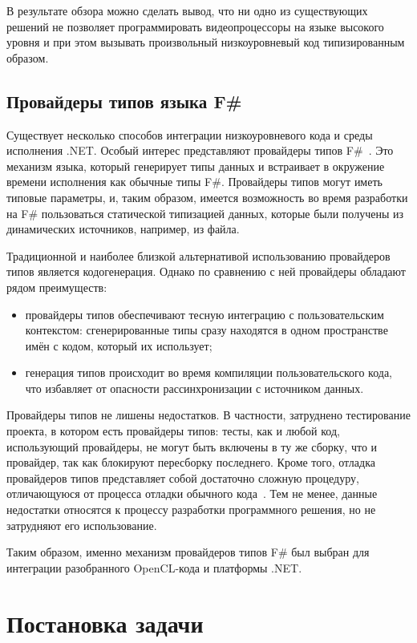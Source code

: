 \documentclass[14pt]{matmex-diploma}
\begin{document}
В результате обзора можно сделать вывод, что ни одно из существующих решений не позволяет программировать видеопроцессоры на языке высокого уровня и при этом вызывать произвольный низкоуровневый код типизированным образом.

\subsection{Провайдеры типов языка F\#}
Существует несколько способов интеграции низкоуровневого кода и среды исполнения .NET. Особый интерес представляют провайдеры типов F\#~\cite{TypeProviders}. Это механизм языка, который генерирует типы данных и встраивает в окружение времени исполнения как обычные типы F\#. Провайдеры типов могут иметь типовые параметры, и, таким образом, имеется возможность во время разработки на F\# пользоваться статической типизацией данных, которые были получены из динамических источников, например, из файла.

Традиционной и наиболее близкой альтернативой использованию провайдеров типов является кодогенерация. Однако по сравнению с ней провайдеры обладают рядом преимуществ:
\begin{itemize}
    \item провайдеры типов обеспечивают тесную интеграцию с пользовательским контекстом: сгенерированные типы сразу находятся в одном пространстве имён с кодом, который их использует;
    \item генерация типов происходит во время компиляции пользовательского кода, что избавляет от опасности рассинхронизации с источником данных.
\end{itemize}

Провайдеры типов не лишены недостатков. В частности, затруднено тестирование проекта, в котором есть провайдеры типов: тесты, как и любой код, использующий провайдеры, не могут быть включены в ту же сборку, что и провайдер, так как блокируют пересборку последнего. Кроме того, отладка провайдеров типов представляет собой достаточно сложную процедуру, отличающуюся от процесса отладки обычного кода~\cite{TypeProvidersTips}. Тем не менее, данные недостатки относятся к процессу разработки программного решения, но не затрудняют его использование.

Таким образом, именно механизм провайдеров типов F\# был выбран для интеграции разобранного OpenCL-кода и платформы .NET.

\section{Постановка задачи}
\end{document}
